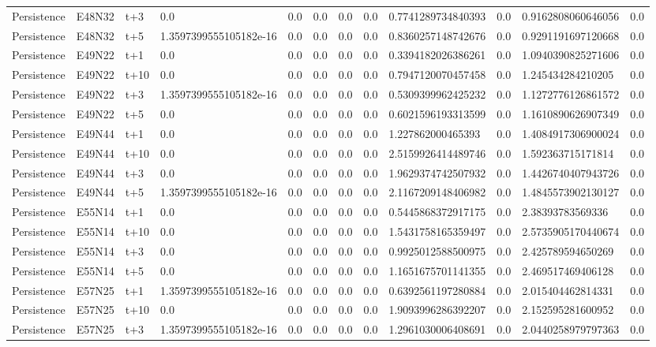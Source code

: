 \begin{landscape}
\begin{longtable}{llllllllllll}
Persistence & E48N32 & t+3 & 0.0 & 0.0 & 0.0 & 0.0 & 0.0 & 0.7741289734840393 & 0.0 & 0.9162808060646056 & 0.0 \\
Persistence & E48N32 & t+5 & 1.3597399555105182e-16 & 0.0 & 0.0 & 0.0 & 0.0 & 0.8360257148742676 & 0.0 & 0.9291191697120668 & 0.0 \\
Persistence & E49N22 & t+1 & 0.0 & 0.0 & 0.0 & 0.0 & 0.0 & 0.3394182026386261 & 0.0 & 1.0940390825271606 & 0.0 \\
Persistence & E49N22 & t+10 & 0.0 & 0.0 & 0.0 & 0.0 & 0.0 & 0.7947120070457458 & 0.0 & 1.245434284210205 & 0.0 \\
Persistence & E49N22 & t+3 & 1.3597399555105182e-16 & 0.0 & 0.0 & 0.0 & 0.0 & 0.5309399962425232 & 0.0 & 1.1272776126861572 & 0.0 \\
Persistence & E49N22 & t+5 & 0.0 & 0.0 & 0.0 & 0.0 & 0.0 & 0.6021596193313599 & 0.0 & 1.1610890626907349 & 0.0 \\
Persistence & E49N44 & t+1 & 0.0 & 0.0 & 0.0 & 0.0 & 0.0 & 1.227862000465393 & 0.0 & 1.4084917306900024 & 0.0 \\
Persistence & E49N44 & t+10 & 0.0 & 0.0 & 0.0 & 0.0 & 0.0 & 2.5159926414489746 & 0.0 & 1.592363715171814 & 0.0 \\
Persistence & E49N44 & t+3 & 0.0 & 0.0 & 0.0 & 0.0 & 0.0 & 1.9629374742507932 & 0.0 & 1.4426740407943726 & 0.0 \\
Persistence & E49N44 & t+5 & 1.3597399555105182e-16 & 0.0 & 0.0 & 0.0 & 0.0 & 2.1167209148406982 & 0.0 & 1.4845573902130127 & 0.0 \\
Persistence & E55N14 & t+1 & 0.0 & 0.0 & 0.0 & 0.0 & 0.0 & 0.5445868372917175 & 0.0 & 2.38393783569336 & 0.0 \\
Persistence & E55N14 & t+10 & 0.0 & 0.0 & 0.0 & 0.0 & 0.0 & 1.5431758165359497 & 0.0 & 2.5735905170440674 & 0.0 \\
Persistence & E55N14 & t+3 & 0.0 & 0.0 & 0.0 & 0.0 & 0.0 & 0.9925012588500975 & 0.0 & 2.425789594650269 & 0.0 \\
Persistence & E55N14 & t+5 & 0.0 & 0.0 & 0.0 & 0.0 & 0.0 & 1.1651675701141355 & 0.0 & 2.469517469406128 & 0.0 \\
Persistence & E57N25 & t+1 & 1.3597399555105182e-16 & 0.0 & 0.0 & 0.0 & 0.0 & 0.6392561197280884 & 0.0 & 2.015404462814331 & 0.0 \\
Persistence & E57N25 & t+10 & 0.0 & 0.0 & 0.0 & 0.0 & 0.0 & 1.9093996286392207 & 0.0 & 2.152595281600952 & 0.0 \\
Persistence & E57N25 & t+3 & 1.3597399555105182e-16 & 0.0 & 0.0 & 0.0 & 0.0 & 1.2961030006408691 & 0.0 & 2.0440258979797363 & 0.0 \\

\end{longtable}
\end{landscape}
